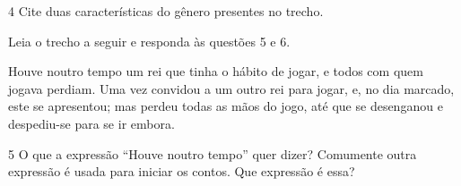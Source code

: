 \num{4} Cite duas características do gênero presentes no trecho.




Leia o trecho a seguir e responda às questões 5 e 6.

\begin{myquote}

Houve noutro tempo um rei que tinha o hábito de jogar, e todos com
quem jogava perdiam. Uma vez convidou a um outro rei para jogar, e, no
dia marcado, este se apresentou; mas perdeu todas as mãos do jogo, até
que se desenganou e despediu-se para se ir embora.

\end{myquote}


\num{5} O que a expressão ``Houve noutro tempo'' quer dizer? Comumente outra
expressão é usada para iniciar os contos. Que expressão é essa?


